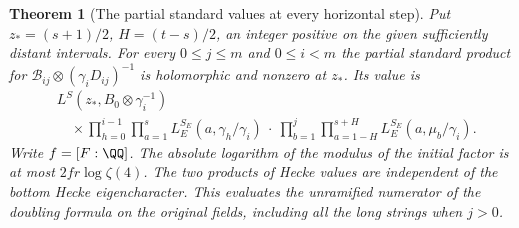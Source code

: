 \documentclass[a4paper,11pt]{article}
\newtheorem{theorem}[proposition]{Theorem}
\theoremstyle{definition}
\theoremstyle{remark}
\numberwithin{equation}{section}
\begin{document}
\begin{theorem}[The partial standard values at every horizontal step]\leavevmode
\label{thm:mixedvalues257}
Put \(z_*=(s+1)/2\), \(H=(t-s)/2\), an integer positive on the
given sufficiently distant intervals. For every \(0\le j\le m\)
and \(0\le i<m\) the partial standard product for
\(\mathcal B_{ij}\otimes(\gamma_i D_{ij})^{-1}\) is holomorphic and
nonzero at \(z_*\). Its value is
\[
\begin{aligned}
 &L^S(z_*,B_0\otimes\gamma_i^{-1})\\
 &\quad{}\times
 \prod_{h=0}^{i-1}\prod_{a=1}^{s}
        L_E^{S_E}(a,\gamma_h/\gamma_i)
 \ \cdot\
 \prod_{b=1}^{j}\prod_{a=1-H}^{s+H}
        L_E^{S_E}(a,\mu_b/\gamma_i).
\end{aligned}
\]
Write \(f=[F:\QQ]\). The absolute logarithm of the modulus of
the initial factor is at most \(2fr\log\zeta(4)\). The two
products of Hecke values are independent of the bottom
Hecke eigencharacter. This evaluates
the unramified numerator of the doubling formula on the original
fields, including all the long strings when \(j>0\).
\end{theorem}
\end{document}
